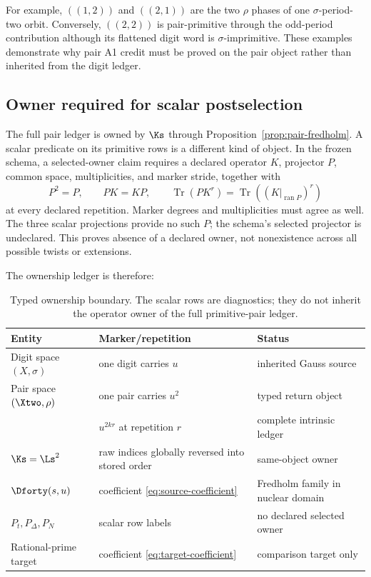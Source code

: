 For example, $((1,2))$ and $((2,1))$ are the two $\rho$ phases of one
$\sigma$-period-two orbit.  Conversely, $((2,2))$ is pair-primitive through
the odd-period contribution although its flattened digit word is
$\sigma$-imprimitive.  These examples demonstrate why pair A1 credit must be
proved on the pair object rather than inherited from the digit ledger.

\subsection{Owner required for scalar postselection}
\label{sec:ownership}

The full pair ledger is owned by $\Ks$ through
Proposition~\ref{prop:pair-fredholm}.  A scalar predicate on its primitive
rows is a different kind of object.  In the frozen schema, a selected-owner
claim requires a declared operator $K$, projector $P$, common space,
multiplicities, and marker stride, together with
\begin{equation}
  P^2=P,\qquad PK=KP,\qquad
  \operatorname{Tr}(PK^r)
  =\operatorname{Tr}\!\left((K|_{\operatorname{ran}P})^r\right)
  \label{eq:owner-predicate}
\end{equation}
at every declared repetition.  Marker degrees and multiplicities must agree
as well.  The three scalar projections provide no such $P$; the schema's
selected projector is undeclared.  This proves absence of a declared owner,
not nonexistence across all possible twists or extensions.

The ownership ledger is therefore:
\begin{table}[htbp]
\centering
\caption{Typed ownership boundary.  The scalar rows are diagnostics; they do
not inherit the operator owner of the full primitive-pair ledger.}
\label{tab:ownership}
\small
\begin{tabularx}{\textwidth}{@{}lY Y@{}}
\toprule
Entity & Marker/repetition & Status \\
\midrule
Digit space $(X,\sigma)$ & one digit carries $u$ & inherited Gauss source \\
Pair space $(\Xtwo,\rho)$ & one pair carries $u^2$ & typed return object \\
\RhoPrimitive{} & $u^{2kr}$ at repetition $r$ & complete intrinsic ledger \\
$\Ks=\Ls^2$ & raw indices globally reversed into stored order & same-object owner \\
$\Dforty(s,u)$ & coefficient \eqref{eq:source-coefficient} & Fredholm family in nuclear domain \\
$P_t,P_\Delta,P_N$ & scalar row labels & no declared selected owner \\
Rational-prime target & coefficient \eqref{eq:target-coefficient} & comparison target only \\
\bottomrule
\end{tabularx}
\end{table}

